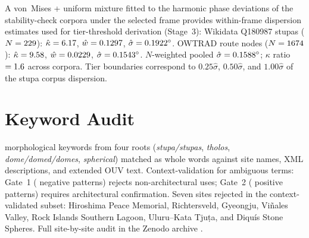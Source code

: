 \documentclass[12pt,a4paper]{article}
\begin{document}
A von~Mises + uniform mixture fitted to the harmonic phase deviations
of the stability-check corpora under the selected frame provides
within-frame dispersion estimates used for tier-threshold derivation
(Stage~3): Wikidata Q180987 stupas ($N = 229{}$):
$\hat{\kappa} = 6.17{}$, $\hat{w} = 0.1297{}$,
$\hat{\sigma} = 0.1922{}^\circ$. OWTRAD route nodes
($N = 1674{}$): $\hat{\kappa} = 9.58{}$,
$\hat{w} = 0.0229{}$,
$\hat{\sigma} = 0.1543{}^\circ$. $N$-weighted pooled
$\hat{\sigma} = 0.1588{}^\circ$; $\kappa$ ratio
$= 1.6{}$ across corpora. Tier boundaries correspond to
$0.25\hat{\sigma}$, $0.50\hat{\sigma}$, and $1.00\hat{\sigma}$ of the
stupa corpus dispersion.

\section{Keyword Audit}
\label{app:keywords}

\NcircKeywords{} morphological keywords from four roots
(\textit{stupa/stupas}, \textit{tholos}, \textit{dome/domed/domes},
\textit{spherical}) matched as whole words against site names, XML
descriptions, and extended OUV text. Context-validation for ambiguous
terms: Gate~1 (\NdomeGateNeg{} negative patterns) rejects
non-architectural uses; Gate~2 (\NdomeGatePos{} positive patterns)
requires architectural confirmation. Seven sites rejected in the
context-validated subset: Hiroshima Peace Memorial, Richtersveld,
Gyeongju, Vi\~{n}ales Valley, Rock Islands Southern Lagoon,
Uluru--Kata Tju\d{t}a, and Diqu\'{i}s Stone Spheres. Full site-by-site
audit in the Zenodo archive \citep{tenenbaum2026audit}.

\end{document}
